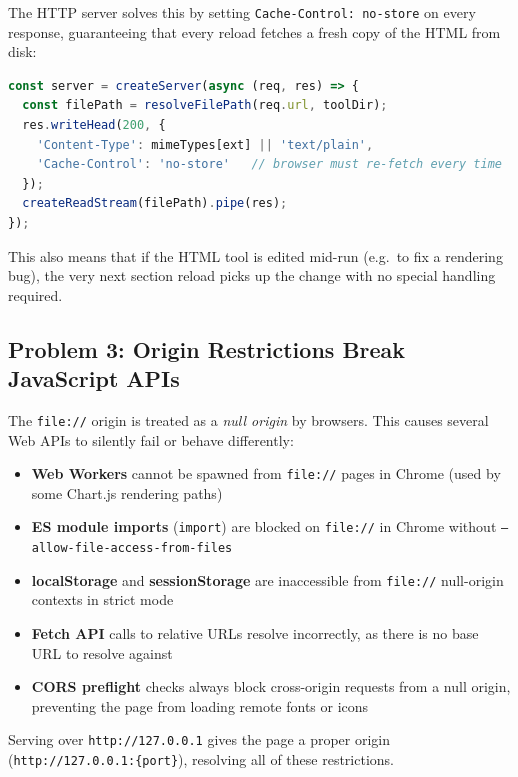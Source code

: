 \documentclass[12pt,a4paper]{article}
\begin{document}
The HTTP server solves this by setting \texttt{Cache-Control: no-store} on
every response, guaranteeing that every reload fetches a fresh copy of the HTML
from disk:

\begin{lstlisting}[language=JavaScript,caption=Cache-Control header in the embedded HTTP server]
const server = createServer(async (req, res) => {
  const filePath = resolveFilePath(req.url, toolDir);
  res.writeHead(200, {
    'Content-Type': mimeTypes[ext] || 'text/plain',
    'Cache-Control': 'no-store'   // browser must re-fetch every time
  });
  createReadStream(filePath).pipe(res);
});
\end{lstlisting}

\noindent This also means that if the HTML tool is edited mid-run (e.g.\ to fix
a rendering bug), the very next section reload picks up the change with no
special handling required.

\subsection{Problem 3: Origin Restrictions Break JavaScript APIs}

The \texttt{file://} origin is treated as a \emph{null origin} by browsers.
This causes several Web APIs to silently fail or behave differently:

\begin{itemize}[leftmargin=2em]
  \item \textbf{Web Workers} cannot be spawned from \texttt{file://} pages in
        Chrome (used by some Chart.js rendering paths)
  \item \textbf{ES module imports} (\texttt{import}) are blocked on
        \texttt{file://} in Chrome without \texttt{--allow-file-access-from-files}
  \item \textbf{localStorage} and \textbf{sessionStorage} are inaccessible from
        \texttt{file://} null-origin contexts in strict mode
  \item \textbf{Fetch API} calls to relative URLs resolve incorrectly, as there
        is no base URL to resolve against
  \item \textbf{CORS preflight} checks always block cross-origin requests from
        a null origin, preventing the page from loading remote fonts or icons
\end{itemize}

Serving over \texttt{http://127.0.0.1} gives the page a proper origin
(\texttt{http://127.0.0.1:\{port\}}), resolving all of these restrictions.
\end{document}
